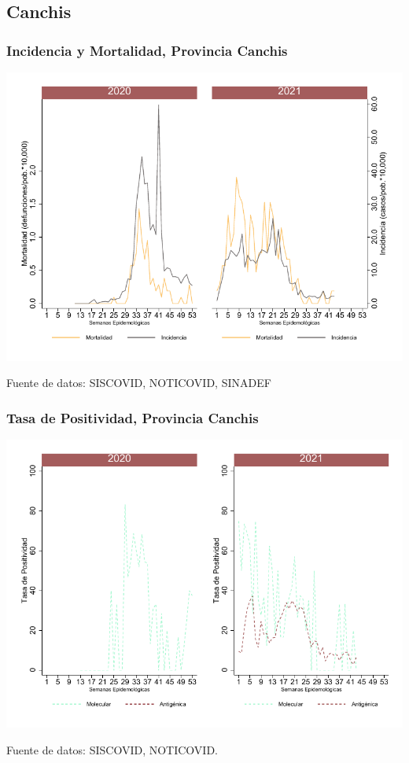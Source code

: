 \documentclass[xcolor=table]{beamer}
\begin{document}
\subsection{Canchis}

\begin{frame}[label=Canchis]
	\frametitle{Incidencia y Mortalidad, Provincia Canchis}
	\vspace{-.5cm}
	\begin{center}
		\includegraphics[width=0.8\linewidth, trim={0cm .5cm 0cm 0.2cm},clip]{../figuras/incidencia_mortalidad_20_21_5.pdf}
	\end{center}
	{\tiny Fuente de datos: SISCOVID, NOTICOVID, SINADEF}
\end{frame}

\begin{frame}
	\frametitle{Tasa de Positividad, Provincia Canchis}
	\vspace{-.5cm}
	\begin{center}
		\includegraphics[width=0.8\linewidth, trim={0cm .5cm 0cm 0.2cm},clip]{../figuras/positividad_20_21_5.pdf}
	\end{center}
	{\tiny Fuente de datos: SISCOVID, NOTICOVID.}
\end{frame}
\end{document}
